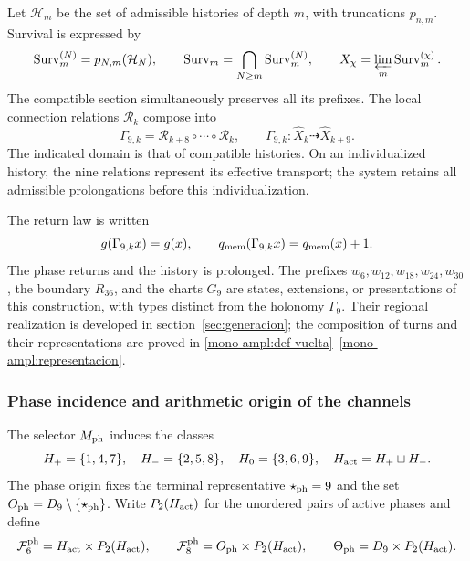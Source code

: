 Let \(\mathcal H_m\) be the set of admissible histories of depth
\(m\), with truncations \(p_{n,m}\). Survival is expressed by
\[
 \operatorname{Surv}_m^{(N)}=p_{N,m}(\mathcal H_N),\qquad
 \operatorname{Surv}_m=\bigcap_{N\geq m}
 \operatorname{Surv}_m^{(N)},\qquad
 X_\chi=\varprojlim_m\operatorname{Surv}_m^{(\chi)}.
\]
The compatible section simultaneously preserves all its prefixes. The
local connection relations \(\mathcal R_k\) compose into
\begin{equation}
 \Gamma_{9,k}=\mathcal R_{k+8}\circ\cdots\circ\mathcal R_k,\qquad
 \Gamma_{9,k}:\widehat X_k\dashrightarrow\widehat X_{k+9}.
 \label{ii:tpk-holonomia}
\end{equation}
The indicated domain is that of compatible histories. On an individualized
history, the nine relations represent its effective transport;
the system retains all admissible prolongations before this
individualization.

The return law is written
\[
 g(\Gamma_{9,k}x)=g(x),\qquad
 q_{\rm mem}(\Gamma_{9,k}x)=q_{\rm mem}(x)+1.
\]
The phase returns and the history is prolonged. The prefixes
\(w_6,w_{12},w_{18},w_{24},w_{30}\), the boundary \(R_{36}\), and the
charts \(G_9\) are states, extensions, or presentations of this
construction, with types distinct from the holonomy \(\Gamma_9\).
Their regional realization is developed in section~\ref{sec:generacion};
the composition of turns and their representations are proved in
\ref{mono-ampl:def-vuelta}--\ref{mono-ampl:representacion}.

\subsubsection{Phase incidence and arithmetic origin of the channels}

The selector \(M_{\rm ph}\) induces the classes
\[
 H_+=\{1,4,7\},\quad H_-=\{2,5,8\},\quad
 H_0=\{3,6,9\},\quad H_{\rm act}=H_+\sqcup H_-.
\]
The phase origin fixes the terminal representative
\(\star_{\rm ph}=9\) and the set
\(O_{\rm ph}=D_9\setminus\{\star_{\rm ph}\}\).
Write \(P_2(H_{\rm act})\) for the unordered pairs of active
phases and define
\[
 \mathcal F_6^{\rm ph}=H_{\rm act}\times P_2(H_{\rm act}),\qquad
 \mathcal F_8^{\rm ph}=O_{\rm ph}\times P_2(H_{\rm act}),\qquad
 \Theta_{\rm ph}=D_9\times P_2(H_{\rm act}).
\]

